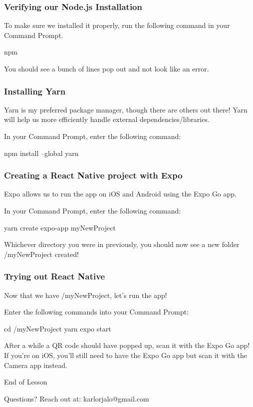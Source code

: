\documentclass{beamer}
\begin{document}
  \begin{frame}[fragile]
    \frametitle{Verifying our Node.js Installation}

    To make sure we installed it properly, run the following command in your Command Prompt.
    \newline
    \begin{bashcode}
npm
    \end{bashcode}
    \vspace{0.5cm}
    You should see a bunch of lines pop out and not look like an error.

  \end{frame}

  \begin{frame}[fragile]
    \frametitle{Installing Yarn}

    Yarn is my preferred package manager, though there are others out there! Yarn will help us more efficiently handle external
    dependencies/libraries.

    In your Command Prompt, enter the following command:
    \newline
    \begin{bashcode}
npm install --global yarn
    \end{bashcode}

  \end{frame}

  \begin{frame}[fragile]
    \frametitle{Creating a React Native project with Expo}

    Expo allows us to run the app on iOS and Android using the Expo Go app. 

    In your Command Prompt, enter the following command:
    \newline
    \begin{bashcode}
yarn create expo-app myNewProject
    \end{bashcode}
    \vspace{0.5cm}
    Whichever directory you were in previously, you should now see a new folder /myNewProject created!
  \end{frame}

  \begin{frame}[fragile]
    \frametitle{Trying out React Native}

    Now that we have /myNewProject, let's run the app!

    Enter the following commands into your Command Prompt:
    \newline
    \begin{bashcode}
cd /myNewProject
yarn expo start
    \end{bashcode}
    \vspace{0.5cm}
    After a while a QR code should have popped up, scan it with the Expo Go app!
    If you're on iOS, you'll still need to have the Expo Go app but scan it with the Camera app instead.
  \end{frame}
  
  \appendix

  \begin{frame}[standout]
    End of Lesson

    {\small Questions? Reach out at:}
    {\footnotesize karlorjalo@gmail.com}
  \end{frame}
\end{document}
